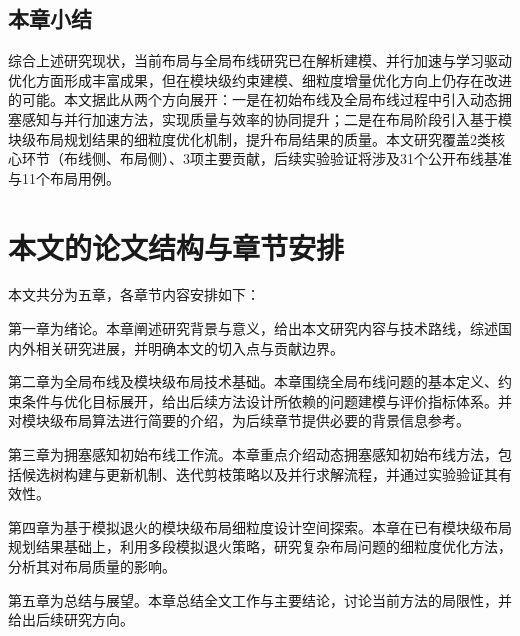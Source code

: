 
\subsection{本章小结}

综合上述研究现状，当前布局与全局布线研究已在解析建模、并行加速与学习驱动优化方面形成丰富成果，但在模块级约束建模、细粒度增量优化方向上仍存在改进的可能。本文据此从两个方向展开：一是在初始布线及全局布线过程中引入动态拥塞感知与并行加速方法，实现质量与效率的协同提升；二是在布局阶段引入基于模块级布局规划结果的细粒度优化机制，提升布局结果的质量。本文研究覆盖2类核心环节（布线侧、布局侧）、3项主要贡献，后续实验验证将涉及31个公开布线基准与11个布局用例。
\section{本文的论文结构与章节安排}

\label{sec:arrangement}

本文共分为五章，各章节内容安排如下：

第一章为绪论。本章阐述研究背景与意义，给出本文研究内容与技术路线，综述国内外相关研究进展，并明确本文的切入点与贡献边界。

第二章为全局布线及模块级布局技术基础。本章围绕全局布线问题的基本定义、约束条件与优化目标展开，给出后续方法设计所依赖的问题建模与评价指标体系。并对模块级布局算法进行简要的介绍，为后续章节提供必要的背景信息参考。

第三章为拥塞感知初始布线工作流。本章重点介绍动态拥塞感知初始布线方法，包括候选树构建与更新机制、迭代剪枝策略以及并行求解流程，并通过实验验证其有效性。

第四章为基于模拟退火的模块级布局细粒度设计空间探索。本章在已有模块级布局规划结果基础上，利用多段模拟退火策略，研究复杂布局问题的细粒度优化方法，分析其对布局质量的影响。

第五章为总结与展望。本章总结全文工作与主要结论，讨论当前方法的局限性，并给出后续研究方向。

